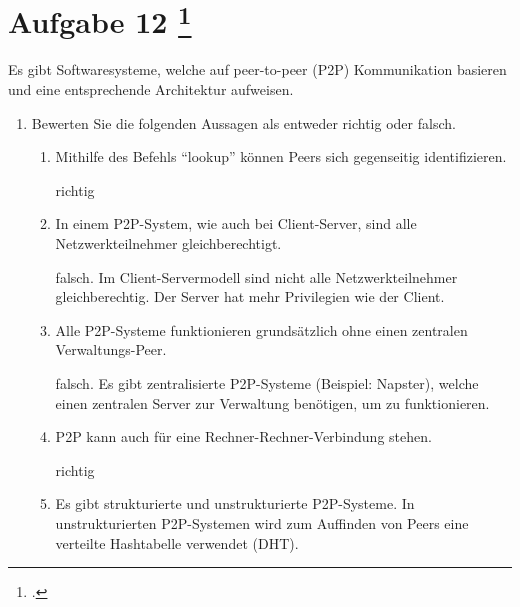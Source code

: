 \documentclass{lehramt-informatik-aufgabe}
\begin{document}
\section{Aufgabe 12
\footcite{66116:2021:03}}

Es gibt Softwaresysteme, welche auf peer-to-peer (P2P) Kommunikation
basieren und eine entsprechende Architektur aufweisen.

\begin{enumerate}


\item Bewerten Sie die folgenden Aussagen als entweder richtig oder
falsch.

\begin{enumerate}
\item Mithilfe des Befehls “lookup” können Peers sich
gegenseitig identifizieren.

\begin{liAntwort}
richtig
\end{liAntwort}

\item In einem P2P-System, wie auch bei Client-Server, sind alle
Netzwerkteilnehmer gleichberechtigt.

\begin{liAntwort}
falsch. Im Client-Servermodell sind nicht alle Netzwerkteilnehmer
gleichberechtig. Der Server hat mehr Privilegien wie der Client.
\end{liAntwort}

\item Alle P2P-Systeme funktionieren grundsätzlich ohne einen
zentralen Verwaltungs-Peer.

\begin{liAntwort}
falsch. Es gibt zentralisierte P2P-Systeme (Beispiel: Napster), welche
einen zentralen Server zur Verwaltung benötigen, um zu funktionieren.
\end{liAntwort}

\item P2P kann auch für eine Rechner-Rechner-Verbindung
stehen.

\begin{liAntwort}
richtig
\end{liAntwort}

\item Es gibt strukturierte und unstrukturierte P2P-Systeme. In
unstrukturierten P2P-Systemen wird zum Auffinden von
Peers eine verteilte Hashtabelle verwendet (DHT).


\end{enumerate}
\end{enumerate}
\end{document}
